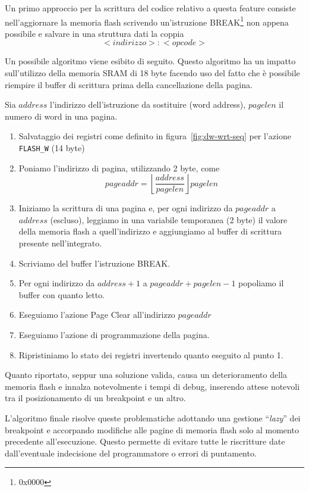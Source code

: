 Un primo approccio per la scrittura del codice relativo a questa feature consiste nell'aggiornare la memoria flash scrivendo un'istruzione BREAK\footnote{0x0000} non appena possibile e salvare in una struttura dati la coppia \[<indirizzo>:<opcode>\]

Un possibile algoritmo viene esibito di seguito. Questo algoritmo ha un impatto sull'utilizzo della memoria SRAM di 18 byte facendo uso del fatto che è possibile riempire il buffer di scrittura prima della cancellazione della pagina.

Sia \(address\) l'indirizzo dell'istruzione da sostituire (word address), \(pagelen\) il numero di word in una pagina.

\begin{enumerate}
    \item Salvataggio dei registri come definito in figura~\ref{fig:dw-wrt-seq} per l'azione \texttt{FLASH\_W} (14 byte)
    \item Poniamo l'indirizzo di pagina, utilizzando 2 byte, come \[pageaddr = \left\lfloor\frac{address}{pagelen}\right\rfloor pagelen\] 
    \item Iniziamo la scrittura di una pagina e, per ogni indirizzo da \(pageaddr\) a \(address\) (escluso), leggiamo in una variabile temporanea (2 byte) il valore della memoria flash a quell'indirizzo e aggiungiamo al buffer di scrittura presente nell'integrato.
    \item Scriviamo del buffer l'istruzione BREAK.\@ 
    \item Per ogni indirizzo da \(address + 1\) a \(pageaddr + pagelen - 1\) popoliamo il buffer con quanto letto. 
    \item Eseguiamo l'azione Page Clear all'indirizzo \(pageaddr\)
    \item Eseguiamo l'azione di programmazione della pagina.
    \item Ripristiniamo lo stato dei registri invertendo quanto eseguito al punto 1.
\end{enumerate}

Quanto riportato, seppur una soluzione valida, causa un deterioramento della memoria flash e innalza notevolmente i tempi di debug, inserendo attese notevoli tra il posizionamento di un breakpoint e un altro.

L'algoritmo finale risolve queste problematiche adottando una gestione ``\textit{lazy}'' dei breakpoint e accorpando modifiche alle pagine di memoria flash solo al momento precedente all'esecuzione.
Questo permette di evitare tutte le riscritture date dall'eventuale indecisione del programmatore o errori di puntamento.

